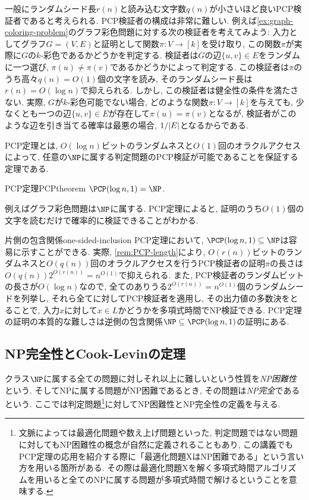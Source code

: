 一般にランダムシード長$r(n)$と読み込む文字数$q(n)$が小さいほど良いPCP検証者であると考えられる.
PCP検証者の構成は非常に難しい.
例えば\cref{ex:graph-coloring-problem}のグラフ彩色問題に対する次の検証者を考えてみよう:
入力としてグラフ$G=(V,E)$と証明として関数$\pi\colon V\to[k]$を受け取り, この関数$\pi$が実際に$G$の$k$-彩色であるかどうかを判定する.
検証者は$G$の辺$\{u,v\}\in E$をランダムに一つ選び, $\pi(u)\neq \pi(v)$であるかどうかによって判定する.
この検証者は$\pi$のうち高々$q(n)=O(1)$個の文字を読み, そのランダムシード長は$r(n)=O(\log n)$で抑えられる.
しかし, この検証者は健全性の条件を満たさない.
実際, $G$が$k$-彩色可能でない場合, どのような関数$\pi\colon V \to [k]$を与えても, 少なくとも一つの辺$\{u,v\}\in E$が存在して$\pi(u)=\pi(v)$となるが, 検証者がこのような辺を引き当てる確率は最悪の場合, $1/\abs{E}$となるからである.

PCP定理とは, $O(\log n)$ビットのランダムネスと$O(1)$回のオラクルアクセスによって, 任意の$\NP$に属する判定問題のPCP検証が可能であることを保証する定理である.
\begin{theorem}{PCP定理}{PCPtheorem}
  $\PCP(\log n,1)=\NP$.
\end{theorem}

例えばグラフ彩色問題は$\NP$に属する. PCP定理によると, 証明のうち$O(1)$個の文字を読むだけで確率的に検証できることがわかる.


\begin{remark}{片側の包含関係}{one-sided-inclusion}
  PCP定理において, $\PCP(\log n,1)\subseteq \NP$は容易に示すことができる.
  実際, \cref{rem:PCP-length}により, $O(r(n))$ビットのランダムネスと$O(q(n))$回のオラクルアクセスを行うPCP検証者の証明$\pi$の長さは$O(q(n))2^{O(r(n))} = n^{O(1)}$で抑えられる.
  また, PCP検証者のランダムビットの長さが$O(\log n)$なので, 全てのありうる$2^{O(r(n))}=n^{O(1)}$個のランダムシードを列挙し, それら全てに対してPCP検証者を適用し, その出力値の多数決をとることで, 入力$x$に対して$x\in L$かどうかを多項式時間でNP検証できる.
  PCP定理の証明の本質的な難しさは逆側の包含関係$\NP\subseteq \PCP(\log n,1)$の証明にある.
\end{remark}

\subsection{NP完全性とCook-Levinの定理}

クラス$\NP$に属する全ての問題に対しそれ以上に難しいという性質を\emph{NP困難性}という.
そしてNPに属する問題がNP困難であるとき, その問題は\emph{NP完全}であるという.
ここでは判定問題\footnote{文脈によっては最適化問題や数え上げ問題といった, 判定問題ではない問題に対してもNP困難性の概念が自然に定義されることもあり, この講義でもPCP定理の応用を紹介する際に「最適化問題XはNP困難である」という言い方を用いる箇所がある. その際は最適化問題Xを解く多項式時間アルゴリズムを用いると全てのNPに属する問題が多項式時間で解けるということを意味する.}に対してNP困難性とNP完全性の定義を与える.

